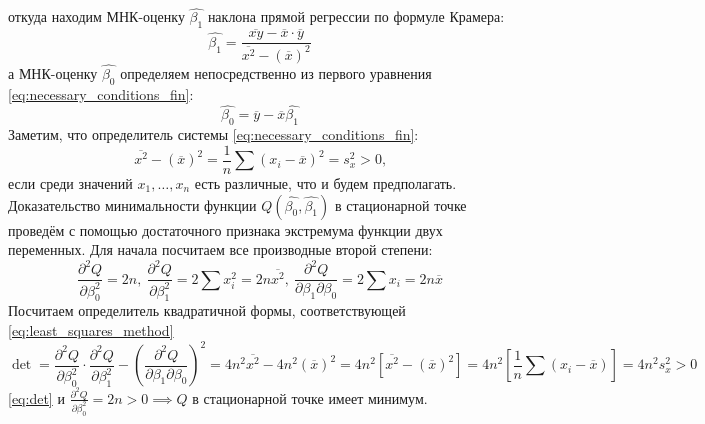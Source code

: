 \documentclass[main.tex]{subfiles}
\begin{document}
откуда находим МНК-оценку $\hat{\beta_1}$ наклона прямой регрессии по формуле Крамера:
\begin{equation} \label{eq:beta_0}
	\hat{\beta_1} = \dfrac{\overline{x y} - \overline{x} \cdot \overline{y}}{\overline{x^2} - (\overline{x})^2}
\end{equation}
а МНК-оценку $\hat{\beta_0}$ определяем непосредственно из первого уравнения \eqref{eq:necessary_conditions_fin}:
\begin{equation} \label{eq:beta_1}
	\hat{\beta_0} = \overline{y} - \overline{x} \hat{\beta_1}
\end{equation}
Заметим, что определитель системы \eqref{eq:necessary_conditions_fin}:
\begin{equation}
	\overline{x^2} - (\overline{x})^2 = \frac{1}{n} \sum (x_i - \overline{x})^2 = s_{x}^2 > 0 \text{,}
\end{equation}
если среди значений $x_1, \dots, x_n$ есть различные, что и будем предполагать. \\
Доказательство минимальности функции $Q(\hat{\beta_0}, \hat{\beta_1})$ в стационарной точке проведём с помощью достаточного признака экстремума функции двух переменных. Для начала посчитаем все производные второй степени:
\begin{equation}
	\dfrac{\partial^2 Q}{\partial \beta_{0}^2} = 2n, \ 
	\dfrac{\partial^2 Q}{\partial \beta_{1}^2} = 2 \sum x_{i}^2 = 2 n \overline{x^2}, \ 
	\dfrac{\partial^2 Q}{\partial \beta_{1} \partial \beta_{0}} = 2 \sum x_i = 2 n \overline{x}
\end{equation}
Посчитаем определитель квадратичной формы, соответствующей \eqref{eq:least_squares_method}
\begin{equation} \label{eq:det}
	\det = \dfrac{\partial^2 Q}{\partial \beta_{0}^2} \cdot \dfrac{\partial^2 Q}{\partial \beta_{1}^2} - (\dfrac{\partial^2 Q}{\partial \beta_{1} \partial \beta_{0}})^2 = 
	4 n^2 \overline{x^2} - 4 n^2 (\overline{x})^2 =
	4 n^2 [\overline{x^2} - (\overline{x})^2] = 
	4 n^2 [\dfrac{1}{n} \sum (x_i - \overline{x})] = 4 n^2 s_{x}^2 > 0
\end{equation} 
\eqref{eq:det} и $\frac{\partial^2 Q}{\partial \beta_{0}^2} = 2 n > 0 \implies Q \text{ в стационарной точке имеет минимум.}$   
\end{document}
